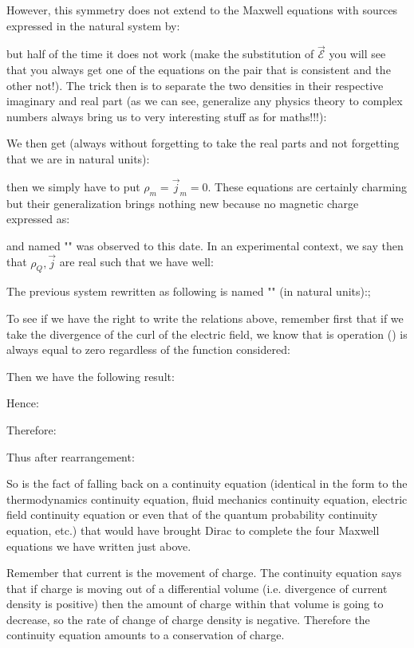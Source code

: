	However, this symmetry does not extend to the Maxwell equations with sources expressed in the natural system by:
	
	but half of the time it does not work (make the substitution of $\vec{\mathcal{E}}$ you will see that you always get one of the equations on the pair that is consistent and the other not!). The trick then is to separate the two densities in their respective imaginary and real part (as we can see, generalize any physics theory to complex numbers always bring us to very interesting stuff as for maths!!!):
	
	We then get (always without forgetting to take the real parts and not forgetting that we are in natural units):
	
	then we simply have to put $\rho_m=\vec{j}_m=0$. These equations are certainly charming but their generalization brings nothing new because no magnetic charge expressed as:
	
	and named "" was observed to this date. In an experimental context, we say then that $\rho_Q,\vec{j}$ are real such that we have well:
	
	The previous system rewritten as following is named "" (in natural units):;
	
	To see if we have the right to write the relations above, remember first that if we take the divergence of the curl of the electric field, we know that is operation () is always equal to zero regardless of the function considered:
	
	Then we have the following result:
	
	Hence:
	
	Therefore:
	
	Thus after rearrangement:
	
	So is the fact of falling back on a continuity equation (identical in the form to the thermodynamics continuity equation, fluid mechanics continuity equation, electric field continuity equation or even that of the quantum probability continuity equation, etc.) that would have brought Dirac to complete the four Maxwell equations we have written just above.
	
	Remember that current is the movement of charge. The continuity equation says that if charge is moving out of a differential volume (i.e. divergence of current density is positive) then the amount of charge within that volume is going to decrease, so the rate of change of charge density is negative. Therefore the continuity equation amounts to a conservation of charge.
	
